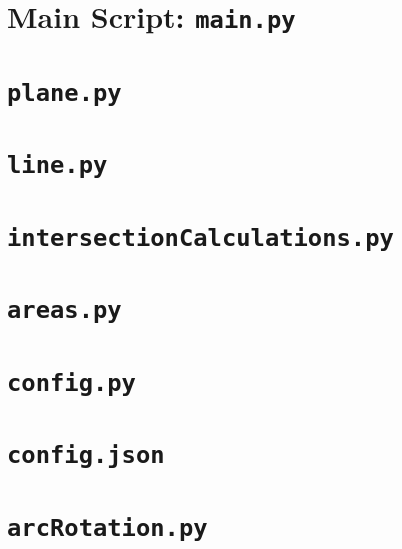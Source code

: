 \section{Main Script: \texttt{main.py}}


\section{\texttt{plane.py}}


\section{\texttt{line.py}}


\section{\texttt{intersectionCalculations.py}}


\section{\texttt{areas.py}}


\section{\texttt{config.py}}


\section{\texttt{config.json}}


\section{\texttt{arcRotation.py}}


